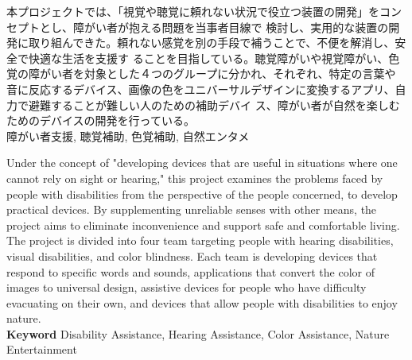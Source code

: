 \documentclass[11pt,a4paper]{report}
\begin{document}
{
    \centerline{
      \huge{}
    }
    \vspace{1cm}
    \noindent\space
    本プロジェクトでは、「視覚や聴覚に頼れない状況で役立つ装置の開発」をコンセプトとし、障がい者が抱える問題を当事者目線で
検討し、実用的な装置の開発に取り組んできた。頼れない感覚を別の手段で補うことで、不便を解消し、安全で快適な生活を支援す
ることを目指している。聴覚障がいや視覚障がい、色覚の障がい者を対象とした４つのグループに分かれ、それぞれ、特定の言葉や
音に反応するデバイス、画像の色をユニバーサルデザインに変換するアプリ、自力で避難することが難しい人のための補助デバイ
ス、障がい者が自然を楽しむためのデバイスの開発を行っている。\\

\noindent{} \indent 障がい者支援, 聴覚補助, 色覚補助, 自然エンタメ

}
\newpage
{
    \centerline{
      \textbf{\huge{}}
    }
    \vspace{1cm}
    \noindent\space
    Under the concept of "developing devices that are useful in situations where one cannot rely on sight or hearing," this project examines the
problems faced by people with disabilities from the perspective of the people concerned, to develop practical devices. By supplementing
unreliable senses with other means, the project aims to eliminate inconvenience and support safe and comfortable living. The project is
divided into four team targeting people with hearing disabilities, visual disabilities, and color blindness. Each team is developing devices that
respond to specific words and sounds, applications that convert the color of images to universal design, assistive devices for people who
have difficulty evacuating on their own, and devices that allow people with disabilities to enjoy nature.\\

\noindent\textbf{\textsf{Keyword}} \indent Disability Assistance, Hearing Assistance, Color Assistance, Nature Entertainment

}
\newpage

\tableofcontents %
\newpage

\pagestyle{fancy}
\fancyhead{} %
\end{document}
